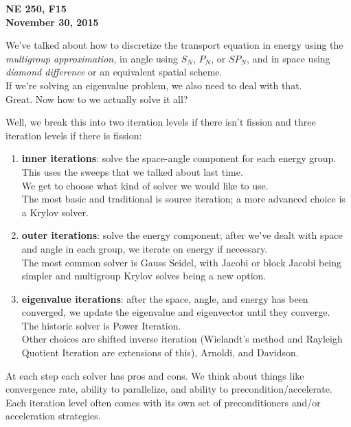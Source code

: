 \documentclass[12pt]{article}
\begin{document}
\begin{center}
{\bf NE 250, F15\\
November 30, 2015 
}
\end{center}

We've talked about how to discretize the transport equation in energy using the \textit{multigroup approximation,} in angle using $S_N$, $P_N$, or $SP_N$, and in space using \textit{diamond difference} or an equivalent spatial scheme. \\
If we're solving an eigenvalue problem, we also need to deal with that.\\
Great. Now how to we actually solve it all? 

Well, we break this into two iteration levels if there isn't fission and three iteration levels if there is fission:
\begin{enumerate}
\item \textbf{inner iterations}: solve the space-angle component for each energy group. This uses the sweeps that we talked about last time. \\
We get to choose what kind of solver we would like to use. \\
The most basic and traditional is source iteration; a more advanced choice is a Krylov solver.

\item \textbf{outer iterations}: solve the energy component; after we've dealt with space and angle in each group, we iterate on energy if necessary. \\
The most common solver is Gauss Seidel, with Jacobi or block Jacobi being simpler and multigroup Krylov solves being a new option.

\item \textbf{eigenvalue iterations}: after the space, angle, and energy has been converged, we update the eigenvalue and eigenvector until they converge.\\
The historic solver is Power Iteration.\\
Other choices are shifted inverse iteration (Wielandt's method and Rayleigh Quotient Iteration are extensions of this), Arnoldi, and Davidson.
\end{enumerate}
At each step each solver has pros and cons. We think about things like convergence rate, ability to parallelize, and ability to precondition/accelerate.\\
Each iteration level often comes with its own set of preconditioners and/or acceleration strategies.
\end{document}

